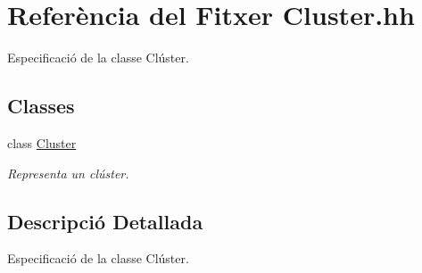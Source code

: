 \hypertarget{_cluster_8hh}{}\section{Referència del Fitxer Cluster.\+hh}
\label{_cluster_8hh}


Especificació de la classe Clúster.  


\subsection*{Classes}
\begin{DoxyCompactItemize}
\item 
class \hyperlink{class_cluster}{Cluster}
\begin{DoxyCompactList}\small\item\em Representa un clúster. \end{DoxyCompactList}\end{DoxyCompactItemize}


\subsection{Descripció Detallada}
Especificació de la classe Clúster. 

